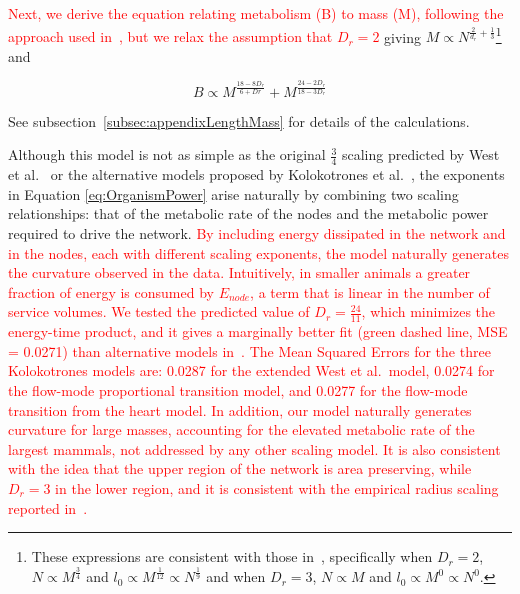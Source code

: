 \documentclass[12pt]{article}
\newcommand{\red}[1]{\textcolor{red}{#1}}
\begin{document}
\red{Next, we derive the equation relating metabolism (B) to mass (M),
  following the approach used in~\cite{banavar10}, but
we relax the assumption that
$D_r=2$} giving $M \propto N^{\frac{2}{d_r} +
\frac{1}{3}}$\footnote{These expressions are consistent with those
in~\cite{banavar10}, specifically when $D_r=2$, $N\propto M^{\frac{3}{4}}$ and
$l_0 \propto M^{\frac{1}{12}}\propto N^{\frac{1}{9}}$ and when $D_r=3$, $N\propto M$ and $l_0\propto M^0 \propto N^0$.} and

\begin{equation}
  \label{eq:OrganismPower}
  B \propto M^{\frac{18-8D_r}{6+Dr}} + M^{\frac{24-2D_r}{18-3D_r}} 
\end{equation}

\noindent See subsection~\ref{subsec:appendixLengthMass} for details of the calculations.

Although this model is not as simple as the original $\frac{3}{4}$
scaling predicted by West et al.~\cite{west97} or the alternative models
proposed by Kolokotrones et al.~\cite{kolokotrones2010curvature}, the
exponents in Equation \ref{eq:OrganismPower} arise naturally by
combining two scaling relationships: that of the metabolic rate of the
nodes and the metabolic power required to drive the network.  
\red{By including energy dissipated in
the network and in the nodes, each with different scaling exponents, the model
naturally generates the curvature observed in the data.  Intuitively, in
smaller animals a greater fraction of energy is consumed by $E_{node}$, a term
that is linear in the number of service volumes.  We tested the predicted value of $D_r =
\frac{24}{11}$, which minimizes the energy-time product, and it gives a marginally better fit (green dashed line, MSE
= 0.0271) than alternative models in~\cite{kolokotrones2010curvature}.
The Mean Squared Errors for the three Kolokotrones models
are: 0.0287 for the extended West et al.\ model, 0.0274 for
the flow-mode proportional transition model, and 0.0277 for the flow-mode
transition from the heart model.  
In addition, our model naturally generates curvature for large
masses, accounting for the elevated metabolic rate of the largest
mammals, not addressed by any other scaling model. It is also consistent with the idea that the upper region of the network
is area preserving, while $D_r = 3$ in the lower region, and it is consistent with the empirical radius
scaling reported in~\cite{newberry2015testing}.  }
\end{document}
